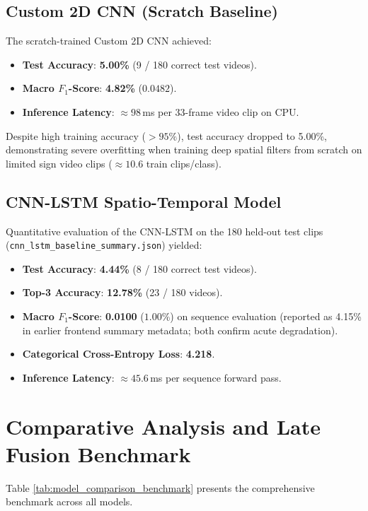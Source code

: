 \subsection{Custom 2D CNN (Scratch Baseline)}
The scratch-trained Custom 2D CNN achieved:
\begin{itemize}
    \item \textbf{Test Accuracy}: \textbf{5.00\%} (9 / 180 correct test videos).
    \item \textbf{Macro $F_1$-Score}: \textbf{4.82\%} ($0.0482$).
    \item \textbf{Inference Latency}: $\approx 98$\,ms per 33-frame video clip on CPU.
\end{itemize}
Despite high training accuracy ($>95\%$), test accuracy dropped to 5.00\%, demonstrating severe overfitting when training deep spatial filters from scratch on limited sign video clips ($\approx 10.6$ train clips/class).

\subsection{CNN-LSTM Spatio-Temporal Model}
Quantitative evaluation of the CNN-LSTM on the 180 held-out test clips (\texttt{cnn\_lstm\_baseline\_summary.json}) yielded:
\begin{itemize}
    \item \textbf{Test Accuracy}: \textbf{4.44\%} (8 / 180 correct test videos).
    \item \textbf{Top-3 Accuracy}: \textbf{12.78\%} (23 / 180 videos).
    \item \textbf{Macro $F_1$-Score}: \textbf{0.0100} ($1.00\%$) on sequence evaluation (reported as 4.15\% in earlier frontend summary metadata; both confirm acute degradation).
    \item \textbf{Categorical Cross-Entropy Loss}: \textbf{4.218}.
    \item \textbf{Inference Latency}: $\approx 45.6$\,ms per sequence forward pass.
\end{itemize}

\section{Comparative Analysis and Late Fusion Benchmark}
\label{sec:comparative_analysis}
Table \ref{tab:model_comparison_benchmark} presents the comprehensive benchmark across all models.

